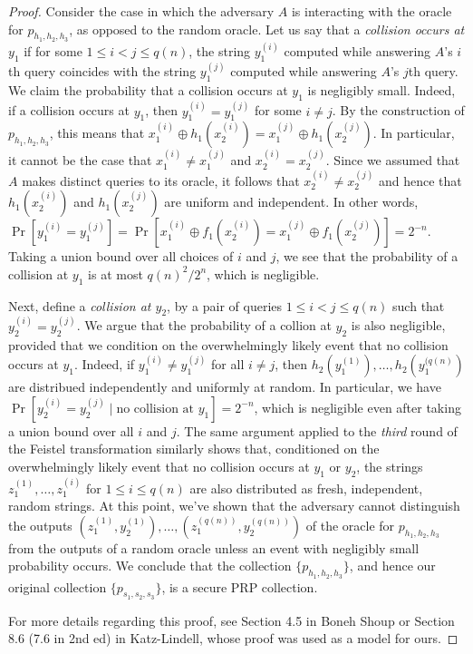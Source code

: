 \begin{proof}
Consider the case in which the adversary \(A\) is interacting with the
oracle for \(p_{h_1,h_2,h_3}\), as opposed to the random oracle. Let us
say that a \emph{collision occurs at \(y_1\)} if for some
\(1 \le i < j \le q(n)\), the string \(y_1^{(i)}\) computed while
answering \(A\)'s \(i\)th query coincides with the string \(y_1^{(j)}\)
computed while answering \(A\)'s \(j\)th query. We claim the probability
that a collision occurs at \(y_1\) is negligibly small. Indeed, if a
collision occurs at \(y_1\), then \(y_1^{(i)} = y_1^{(j)}\) for some
\(i \neq j\). By the construction of \(p_{h_1,h_2,h_3}\), this means
that
\(x_1^{(i)} \oplus h_1(x_2^{(i)}) = x_1^{(j)} \oplus h_1(x_2^{(j)})\).
In particular, it cannot be the case that \(x_1^{(i)} \neq x_1^{(j)}\)
and \(x_2^{(i)} = x_2^{(j)}\). Since we assumed that \(A\) makes
distinct queries to its oracle, it follows that
\(x_2^{(i)} \neq x_2^{(j)}\) and hence that \(h_1(x_2^{(i)})\) and
\(h_1(x_2^{(j)})\) are uniform and independent. In other words,
\(\Pr[y_1^{(i)} = y_1^{(j)}] = \Pr[x_1^{(i)} \oplus f_1(x_2^{(i)}) = x_1^{(j)} \oplus f_1(x_2^{(j)})] = 2^{-n}\).
Taking a union bound over all choices of \(i\) and \(j\), we see that
the probability of a collision at \(y_1\) is at most \(q(n)^2/2^n\),
which is negligible.

Next, define a \emph{collision at \(y_2\)}, by a pair of queries
\(1 \le i < j \le q(n)\) such that \(y_2^{(i)} = y_2^{(j)}\). We argue
that the probability of a collion at \(y_2\) is also negligible,
provided that we condition on the overwhelmingly likely event that no
collision occurs at \(y_1\). Indeed, if \(y_1^{(i)} \neq y_1^{(j)}\) for
all \(i \neq j\), then \(h_2(y_1^{(1)}), \ldots, h_2(y_1^{(q(n)})\) are
distribued independently and uniformly at random. In particular, we have
\(\Pr[y_2^{(i)} = y_2^{(j)} \mid \text{no collision at }y_1] = 2^{-n}\),
which is negligible even after taking a union bound over all \(i\) and
\(j\). The same argument applied to the \emph{third} round of the
Feistel transformation similarly shows that, conditioned on the
overwhelmingly likely event that no collision occurs at \(y_1\) or
\(y_2\), the strings \(z_1^{(1)}, \ldots, z_1^{(i)}\) for
\(1 \le i \le q(n)\) are also distributed as fresh, independent, random
strings. At this point, we've shown that the adversary cannot
distinguish the outputs
\((z_1^{(1)}, y_2^{(1)}), \ldots, (z_1^{(q(n))}, y_2^{(q(n))})\) of the
oracle for \(p_{h_1,h_2,h_3}\) from the outputs of a random oracle
unless an event with negligibly small probability occurs. We conclude
that the collection \(\{p_{h_1,h_2,h_3}\}\), and hence our original
collection \(\{p_{s_1,s_2,s_3}\}\), is a secure PRP collection.

For more details regarding this proof, see Section 4.5 in Boneh Shoup or
Section 8.6 (7.6 in 2nd ed) in Katz-Lindell, whose proof was used as a
model for ours.

\end{proof}


